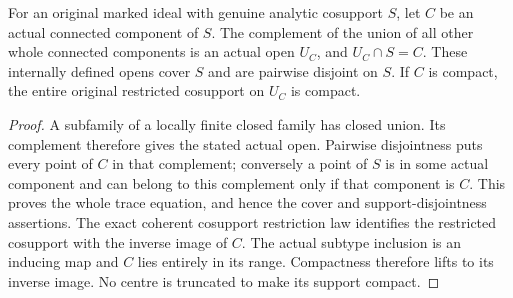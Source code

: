 \begin{lemma}
\label{hir:original-compact-support-component-windows}
\leanok
For an original marked ideal with genuine analytic cosupport $S$, let $C$
be an actual connected component of $S$. The complement of the union of
all other whole connected components is an actual open $U_C$, and
$U_C\cap S=C$. These internally defined opens cover $S$ and are pairwise
disjoint on $S$. If $C$ is compact, the entire original restricted
cosupport on $U_C$ is compact.
\end{lemma}
\begin{proof}
A subfamily of a locally finite closed family has closed union. Its
complement therefore gives the stated actual open. Pairwise disjointness
puts every point of $C$ in that complement; conversely a point of $S$
is in some actual component and can belong to this complement only if
that component is $C$. This proves the whole trace equation, and hence
the cover and support-disjointness assertions. The exact coherent
cosupport restriction law identifies the restricted cosupport with the
inverse image of $C$. The actual subtype inclusion is an inducing map
and $C$ lies entirely in its range. Compactness therefore lifts to its
inverse image. No centre is truncated to make its support compact.
\end{proof}

